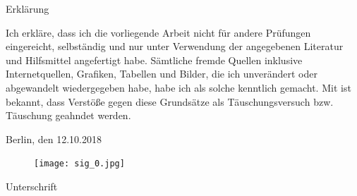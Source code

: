 \documentclass[10pt]{article}
\begin{document}
\onecolumn
\newpage
\large{Erkl\"arung}

Ich erkl\"are, dass ich die vorliegende Arbeit nicht f\"ur andere Pr\"ufungen eingereicht, selbst\"andig und nur unter Verwendung der angegebenen Literatur und Hilfsmittel angefertigt habe. S\"amtliche fremde Quellen inklusive Internetquellen, Grafiken, Tabellen und Bilder, die ich unver\"andert oder abgewandelt wiedergegeben habe, habe ich als solche kenntlich gemacht. Mit ist bekannt, dass Verst\"oße gegen diese Grunds\"atze als T\"auschungsversuch bzw. T\"auschung geahndet werden.

Berlin, den 12.10.2018\\

\begin{figure}
\texttt{[image: sig\_0.jpg]}
\end{figure}

Unterschrift
\end{document}
